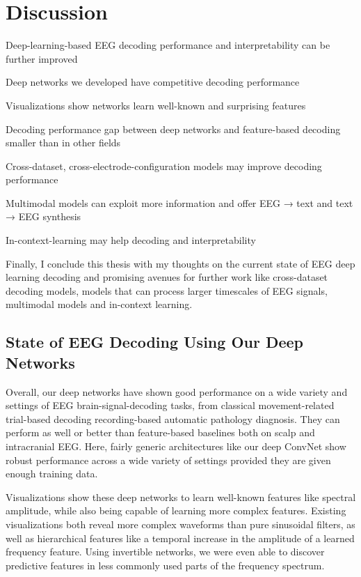 \chapter{Discussion}\label{discussion}

\begin{startbox}{Deep-learning-based EEG decoding performance and interpretability can be further improved}
\item Deep networks we developed have competitive decoding performance
\item Visualizations show networks learn well-known and surprising features
\item Decoding performance gap between deep networks and feature-based decoding smaller than in other fields
\item Cross-dataset, cross-electrode-configuration models may improve decoding performance
\item Multimodal models can exploit more information and offer EEG → text and text → EEG synthesis
\item In-context-learning may help decoding and interpretability
\end{startbox}


Finally, I conclude this thesis with my thoughts on the current state of
EEG deep learning decoding and promising avenues for further work like
cross-dataset decoding models, models that can process larger timescales
of EEG signals, multimodal models and in-context learning.

\section{State of EEG Decoding Using Our Deep
Networks}\label{state-of-eeg-decoding-using-our-deep-networks}

Overall, our deep networks have shown good performance on a wide variety
and settings of EEG brain-signal-decoding tasks, from classical
movement-related trial-based decoding recording-based automatic
pathology diagnosis. They can perform as well or better than
feature-based baselines both on scalp and intracranial EEG. Here, fairly
generic architectures like our deep ConvNet show robust performance
across a wide variety of settings provided they are given enough
training data.

Visualizations show these deep networks to learn well-known features
like spectral amplitude, while also being capable of learning more
complex features. Existing visualizations both reveal more complex
waveforms than pure sinusoidal filters, as well as hierarchical features
like a temporal increase in the amplitude of a learned frequency
feature. Using invertible networks, we were even able to discover
predictive features in less commonly used parts of the frequency
spectrum.

